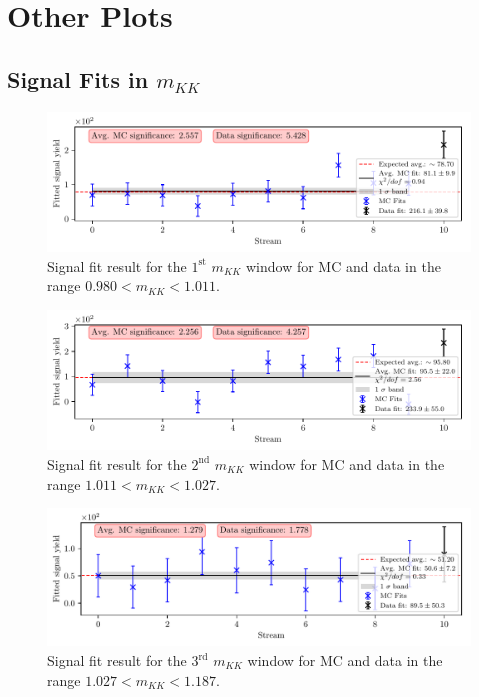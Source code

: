 \chapter{Other Plots}

\section{Signal Fits in \texorpdfstring{$m_{KK}$}{mKK}}
\label{sec:mKK_plots}
\begin{figure}[H]
	\centering
	\captionsetup{width=0.8\linewidth}
	\includegraphics[width=\linewidth]{fig/sig_mKK_1}
	\caption{Signal fit result for the $1^{\mathrm{st}}$ $m_{KK}$ window for MC and data in the range $0.980  < m_{KK} < 1.011$.}
\end{figure} 

\begin{figure}[H]
	\centering
	\captionsetup{width=0.8\linewidth}
	\includegraphics[width=\linewidth]{fig/sig_mKK_2}
	\caption{Signal fit result for the $2^{\mathrm{nd}}$ $m_{KK}$ window for MC and data in the range $1.011  < m_{KK} < 1.027$.}
\end{figure}

\begin{figure}[H]
	\centering
	\captionsetup{width=0.8\linewidth}
	\includegraphics[width=\linewidth]{fig/sig_mKK_3}
	\caption{Signal fit result for the $3^{\mathrm{rd}}$ $m_{KK}$ window for MC and data in the range $1.027  < m_{KK} < 1.187$.}
\end{figure}

